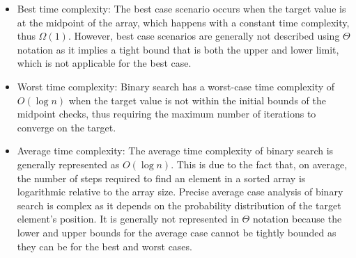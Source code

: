     \begin{itemize}
        \item Best time complexity: The best case scenario occurs when the target value is at the midpoint of the array, which happens with a constant time complexity, thus $\Omega(1)$. However, best case scenarios are generally not described using $\Theta$ notation as it implies a tight bound that is both the upper and lower limit, which is not applicable for the best case.
        \item Worst time complexity: Binary search has a worst-case time complexity of $O(\log n)$ when the target value is not within the initial bounds of the midpoint checks, thus requiring the maximum number of iterations to converge on the target.
        \item Average time complexity: The average time complexity of binary search is generally represented as $O(\log n)$. This is due to the fact that, on average, the number of steps required to find an element in a sorted array is logarithmic relative to the array size. Precise average case analysis of binary search is complex as it depends on the probability distribution of the target element's position. It is generally not represented in $\Theta$ notation because the lower and upper bounds for the average case cannot be tightly bounded as they can be for the best and worst cases.
    \end{itemize}
    
